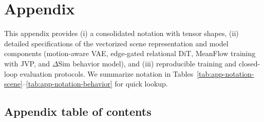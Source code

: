 \documentclass{article}
\newcommand{\EdgeDiT}{edge-gated relational DiT}
\theoremstyle{plain}
\theoremstyle{definition}
\theoremstyle{remark}
\begin{document}
\section{Appendix}
\label{sec:appendix}

This appendix provides (i) a consolidated notation with tensor shapes, (ii) detailed specifications of the vectorized
scene representation and model components (motion-aware VAE, \EdgeDiT, MeanFlow training with JVP,
and \(\Delta\)Sim behavior model), and (iii) reproducible training and closed-loop evaluation protocols. We summarize notation in Tables~\ref{tab:app-notation-scene}--\ref{tab:app-notation-behavior} for quick lookup.

\makeatletter
{}
\makeatother

\subsection{Appendix table of contents}
\label{app:toc}
\end{document}
